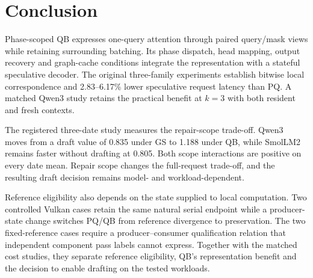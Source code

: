 \section{Conclusion}
Phase-scoped QB expresses one-query attention through paired query/mask views while retaining surrounding batching. Its phase dispatch, head mapping, output recovery and graph-cache conditions integrate the representation with a stateful speculative decoder. The original three-family experiments establish bitwise local correspondence and 2.83--6.17\% lower speculative request latency than PQ. A matched Qwen3 study retains the practical benefit at $k=3$ with both resident and fresh contexts.

The registered three-date study measures the repair-scope trade-off. Qwen3 moves from a draft value of 0.835 under GS to 1.188 under QB, while SmolLM2 remains faster without drafting at 0.805. Both scope interactions are positive on every date mean. Repair scope changes the full-request trade-off, and the resulting draft decision remains model- and workload-dependent.

Reference eligibility also depends on the state supplied to local computation. Two controlled Vulkan cases retain the same natural serial endpoint while a producer-state change switches PQ/QB from reference divergence to preservation. The two fixed-reference cases require a producer--consumer qualification relation that independent component pass labels cannot express. Together with the matched cost studies, they separate reference eligibility, QB's representation benefit and the decision to enable drafting on the tested workloads.
